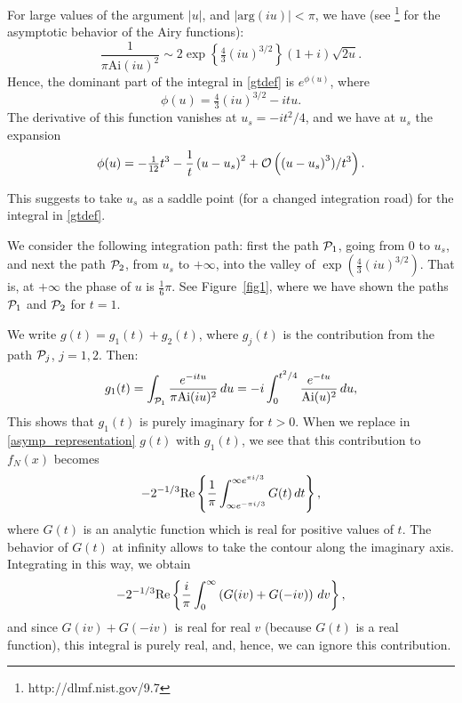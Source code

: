 \documentclass[11pt]{article}
\begin{document}
For large values of the argument $|u|$, and $|\mbox{arg}(iu)|<\pi$, we have (see {{\small \sc {}}}\footnote{http://dlmf.nist.gov/9.7} for the asymptotic behavior of the Airy functions):
\begin{equation}
\label{inside_function}
\frac1{\pi{\mbox{Ai}}(iu)^2}\sim 2\exp\left\{\tfrac43(iu)^{3/2}\right\}
(1+i)\sqrt{2u}.
\end{equation}
Hence, the dominant part of the integral in \eqref{gtdef} is $e^{\phi(u)}$, where
\begin{equation}\label{phidef}
\phi(u)=\tfrac43(iu)^{3/2}-itu.
\end{equation}
The derivative of this function vanishes at $u_s=-it^2/4$, and we have at $u_s$ the expansion
\begin{equation}\label{phiexpf}
\phi(u)=-\tfrac1{12}t^3-\frac{1}{t}\left(u-u_s\right)^2+{{\cal O}}\left(\left(u-u_s\right)^3)/t^3\right).
\end{equation}

This suggests to take $u_s$ as a saddle point (for a changed integration road) for the integral in \eqref{gtdef}.

We consider the following integration path: first the path ${{\cal P}}_1$, going from $0$ to $u_s$, and next the path ${{\cal P}}_2$, from $u_s$ to $+\infty$, into the valley of $\exp(\tfrac43(iu)^{3/2})$. That is, at $+\infty$ the phase of $u$ is $\frac16\pi$. See Figure~\ref{fig1}, where we have shown the paths ${{\cal P}}_1$ and ${{\cal P}}_2$  for $t=1$.

We write $g(t)=g_1(t)+g_2(t)$, where $g_j(t)$ is the contribution from the path ${{\cal P}}_j$, $j=1,2$. Then:
$$
g_1(t)=\int_{{{\cal P}}_1}\frac{e^{-itu}}{\pi{\mbox{Ai}}(iu)^2}\,du
=-i\int_0^{t^2/4}\frac{e^{-tu}}{{\mbox{Ai}}(u)^2}\,du,
$$
This shows that $g_1(t)$ is purely imaginary for $t>0$.  When we replace in \eqref{asymp_representation}  $g(t)$ with $g_1(t)$, we see that this contribution to $f_N(x)$ becomes
$$
-2^{-1/3}\mbox{\rm Re}\left\{\frac1{\pi }\int_{\infty e^{-\pi i/3}}^{\infty  e^{\pi i/3}}G(t)\,dt\right\},
$$
where $G(t)$ is an analytic function which is real for positive values of $t$. The behavior of $G(t)$ at infinity allows to take the contour along the imaginary axis. Integrating in this way, we obtain
$$
-2^{-1/3}\mbox{\rm Re}\left\{\frac{i}{\pi }\int_{0}^{\infty}\left(G(iv)+G(-iv)\right)\,dv\right\},
$$
and since $G(iv)+G(-iv)$ is real for real $v$ (because $G(t)$ is a real function), this integral is purely real, and, hence, we can ignore this contribution.
\end{document}
